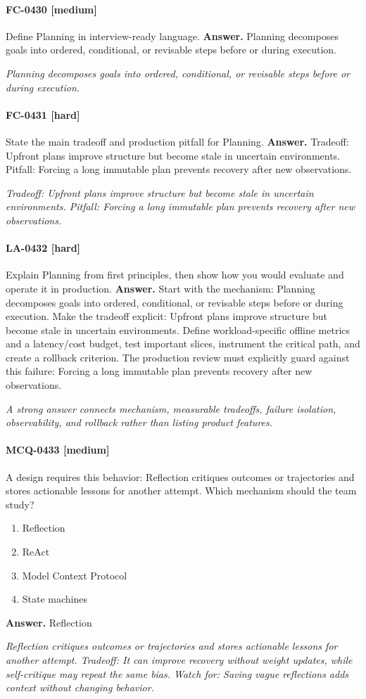 \paragraph{FC-0430 [medium]} Define Planning in interview-ready language.
\noindent\textbf{Answer.} Planning decomposes goals into ordered, conditional, or revisable steps before or during execution.
\par\textit{Planning decomposes goals into ordered, conditional, or revisable steps before or during execution.}
\paragraph{FC-0431 [hard]} State the main tradeoff and production pitfall for Planning.
\noindent\textbf{Answer.} Tradeoff: Upfront plans improve structure but become stale in uncertain environments. Pitfall: Forcing a long immutable plan prevents recovery after new observations.
\par\textit{Tradeoff: Upfront plans improve structure but become stale in uncertain environments. Pitfall: Forcing a long immutable plan prevents recovery after new observations.}
\paragraph{LA-0432 [hard]} Explain Planning from first principles, then show how you would evaluate and operate it in production.
\noindent\textbf{Answer.} Start with the mechanism: Planning decomposes goals into ordered, conditional, or revisable steps before or during execution. Make the tradeoff explicit: Upfront plans improve structure but become stale in uncertain environments. Define workload-specific offline metrics and a latency/cost budget, test important slices, instrument the critical path, and create a rollback criterion. The production review must explicitly guard against this failure: Forcing a long immutable plan prevents recovery after new observations.
\par\textit{A strong answer connects mechanism, measurable tradeoffs, failure isolation, observability, and rollback rather than listing product features.}
\paragraph{MCQ-0433 [medium]} A design requires this behavior: Reflection critiques outcomes or trajectories and stores actionable lessons for another attempt. Which mechanism should the team study?
\begin{enumerate}[label=\Alph*.]
\item Reflection
\item ReAct
\item Model Context Protocol
\item State machines
\end{enumerate}
\noindent\textbf{Answer.} Reflection
\par\textit{Reflection critiques outcomes or trajectories and stores actionable lessons for another attempt. Tradeoff: It can improve recovery without weight updates, while self-critique may repeat the same bias. Watch for: Saving vague reflections adds context without changing behavior.}
